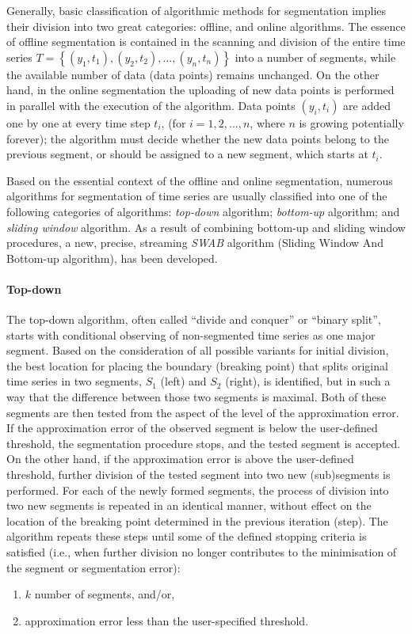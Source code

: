 \documentclass[a4paper]{article}
\begin{document}
Generally, basic classification of algorithmic methods for segmentation implies their division into two great categories: offline, and online algorithms. The essence of offline segmentation is contained in the scanning and division of the entire time series $ T = \left\{ \left( y_1, t_1\right), \left(y_2, t_2 \right), \dots ,\left(y_n, t_n\right)\right\} $ into a number of segments, while the available number of data (data points) remains unchanged. On the other hand, in the online segmentation the uploading of new data points is performed in parallel with the execution of the algorithm. Data points $\left(y_i, t_i\right)$ are added one by one at every time step $t_i$, (for $i = 1,2, \dots ,n$, where $n$ is growing potentially forever); the algorithm must decide whether the new data points belong to the previous segment, or should be assigned to a new segment, which starts at $t_i$. 

Based on the essential context of the offline and online segmentation, numerous algorithms for segmentation of time series are usually classified into one of the following categories of algorithms: \emph{top-down} algorithm; \emph{bottom-up} algorithm; and \emph{sliding window} algorithm. As a result of combining bottom-up and sliding window procedures, a new, precise, streaming \emph{SWAB} algorithm (Sliding Window And Bottom-up algorithm), has been developed.

\paragraph{Top-down} The top-down algorithm, often called \enquote{divide and conquer} or \enquote{binary split}, starts with conditional observing of non-segmented time series as one major segment. Based on the consideration of all possible variants for initial division, the best location for placing the boundary (breaking point) that splits original time series in two segments, $S_1$ (left) and $S_2$ (right), is identified, but in such a way that the difference between those two segments is maximal. Both of these segments are then tested from the aspect of the level of the approximation error. If the approximation error of the observed segment is below the user-defined threshold, the segmentation procedure stops, and the tested segment is accepted. On the other hand, if the approximation error is above the user-defined threshold, further division of the tested segment into two new (sub)segments is performed. For each of the newly formed segments, the process of division into two new segments is repeated in an identical manner, without effect on the location of the breaking point determined in the previous iteration (step). The algorithm repeats these steps until some of the defined stopping criteria is satisfied (i.e., when further division no longer contributes to the minimisation of the segment or segmentation error): 
\begin{enumerate}
	\item $k$ number of segments, and/or,
	\item approximation error less than the user-specified threshold.
\end{enumerate} 
\end{document}
